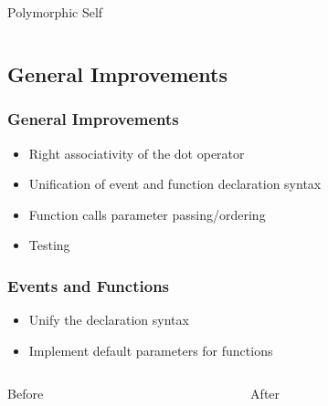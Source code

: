 \documentclass[aspectratio=169]{beamer}
\begin{document}
\begin{frame}{Polymorphic Self}
\inputminted{swift}{code/polymorphic-self.flint}
\end{frame}

\subsection{General Improvements}
\begin{frame}
\frametitle{General Improvements}
\begin{itemize}
    \item Right associativity of the dot operator
    \item Unification of event and function declaration syntax
    \item Function calls parameter passing/ordering
    \item Testing
\end{itemize}
\end{frame}

\begin{frame}
\frametitle{Events and Functions}
\begin{itemize}
    \item Unify the declaration syntax
    \item Implement default parameters for functions
\end{itemize}
    \begin{columns}
        \begin{column}{0.5\textwidth}
            \begin{block}{Before}
	        \inputminted[fontsize=\small]{swift}{code/events-before.flint}
	        \end{block}
        \end{column}
        \begin{column}{0.5\textwidth}
            \begin{block}{After}
	        \inputminted[fontsize=\small]{swift}{code/events-after.flint}
	        \end{block}
        \end{column}
    \end{columns}
\end{frame}
\end{document}
